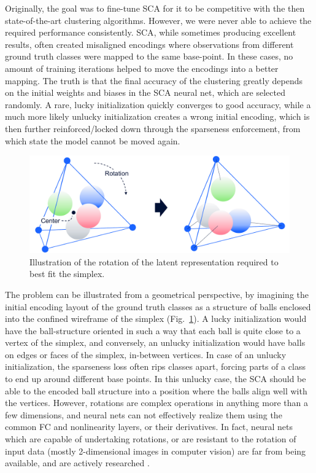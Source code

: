 		Originally, the goal was to fine-tune \ac{SCA} for it to be competitive with the then state-of-the-art clustering algorithms.
		However, we were never able to achieve the required performance consistently.
		\ac{SCA}, while sometimes producing excellent results, often created misaligned encodings where observations from different ground truth classes were mapped to the same base-point.
		In these cases, no amount of training iterations helped to move the encodings into a better mapping.
		The truth is that the final accuracy of the clustering greatly depends on the initial weights and biases in the \ac{SCA} neural net, which are selected randomly.
		A rare, lucky initialization quickly converges to good accuracy, while a much more likely unlucky initialization creates a wrong initial encoding, which is then further reinforced/locked down through the sparseness enforcement, from which state the model cannot be moved again.
		
		\begin{figure}[ht]
			\centering
			\includegraphics[width=0.8\linewidth]{figures/06_sparse_clust/init_rotate/init_rotate.pdf}
			\caption[Rotation capability required by SCA]{Illustration of the rotation of the latent representation required to best fit the simplex.}
			\label{fig:init_rotate}
		\end{figure}
		
		The problem can be illustrated from a geometrical perspective, by imagining the initial encoding layout of the ground truth classes as a structure of balls enclosed into the confined wireframe of the simplex (Fig.~\ref{fig:init_rotate}).
		A lucky initialization would have the ball-structure oriented in such a way that each ball is quite close to a vertex of the simplex, and conversely, an unlucky initialization would have balls on edges or faces of the simplex, in-between vertices.
		In case of an unlucky initialization, the sparseness loss often rips classes apart, forcing parts of a class to end up around different base points.
		In this unlucky case, the \ac{SCA} should be able to  the encoded ball structure into a position where the balls align well with the vertices.
		However, rotations are complex operations in anything more than a few dimensions, and neural nets can not effectively realize them using the common \ac{FC} and nonlinearity layers, or their derivatives.
		In fact, neural nets which are capable of undertaking rotations, or are resistant to the rotation of input data (mostly 2-dimensional images in computer vision) are far from being available, and are actively researched \cite{rotation_invariant_1, rotation_invariant_2}.
		
